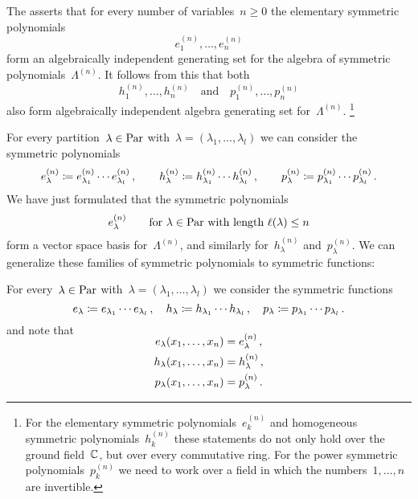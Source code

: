 \documentclass[a4paper,11pt]{scrartcl}
\begin{document}
The  asserts that for every number of variables~$n \geq 0$ the elementary symmetric polynomials
\[
  e^{(n)}_1, \dotsc, e^{(n)}_n
\]
form an algebraically independent generating set for the algebra of symmetric polynomials~$\Lambda^{(n)}$.
It follows from this that both
\[
  h^{(n)}_1, \dotsc, h^{(n)}_n
  \quad\text{and}\quad
  p^{(n)}_1, \dotsc, p^{(n)}_n
\]
also form algebraically independent algebra generating set for~$\Lambda^{(n)}$.%
\footnote{
  For the elementary symmetric polynomials~$e^{(n)}_k$ and homogeneous symmetric polynomials~$h^{(n)}_k$ these statements do not only hold over the ground field~$\mathbb{C}$, but over every commutative ring.
  For the power symmetric polynomials~$p^{(n)}_k$ we need to work over a field in which the numbers~$1, \dotsc, n$ are invertible.
}

For every partition~$\lambda \in \mathrm{Par}$ with~$\lambda = (\lambda_1, \dotsc, \lambda_l)$ we can consider the symmetric polynomials
\[
  e^{(n)}_\lambda
  \coloneqq
  e^{(n)}_{\lambda_1} \dotsm e^{(n)}_{\lambda_l} \,,
  \qquad
  h^{(n)}_\lambda
  \coloneqq
  h^{(n)}_{\lambda_1} \dotsm h^{(n)}_{\lambda_l} \,,
  \qquad
  p^{(n)}_\lambda
  \coloneqq
  p^{(n)}_{\lambda_1} \dotsm p^{(n)}_{\lambda_l} \,.
\]
We have just formulated that the symmetric polynomials
\[
  e^{(n)}_\lambda
  \qquad
  \text{for $\lambda \in \mathrm{Par}$ with length~$\ell(\lambda) \leq n$}
\]
form a vector space basis for~$\Lambda^{(n)}$, and similarly for~$h^{(n)}_\lambda$ and~$p^{(n)}_\lambda$.
We can generalize these families of symmetric polynomials to symmetric functions:

\begin{example}
  For every~$\lambda \in \mathrm{Par}$ with~$\lambda = (\lambda_1, \dotsc, \lambda_l)$ we consider the symmetric functions
  \[
    e_\lambda
    \coloneqq
    e_{\lambda_1} \dotsm e_{\lambda_l} \,,
    \quad
    h_\lambda
    \coloneqq
    h_{\lambda_1} \dotsm h_{\lambda_l} \,,
    \quad
    p_\lambda
    \coloneqq
    p_{\lambda_1} \dotsm p_{\lambda_l} \,.
  \]
  and note that
  \begin{align*}
    \SwapAboveDisplaySkip
    e_\lambda(x_1, \dotsc, x_n)
    &=
    e^{(n)}_\lambda \,,
    \\
    h_\lambda(x_1, \dotsc, x_n)
    &=
    h^{(n)}_\lambda \,,
    \\
    p_\lambda(x_1, \dotsc, x_n)
    &=
    p^{(n)}_\lambda \,.
  \end{align*}
\end{example}
\end{document}
